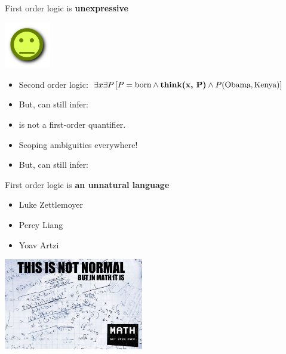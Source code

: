 \begin{frame}{First order logic is \textbf{unexpressive}}
\begin{center}
  \includegraphics[height=2cm]{../img/pokerface.png}
\end{center}

\begin{itemize}
\item Second order logic: 
      $\exists x \exists P \left[ P = \textrm{born} \land \textbf{\textrm{think}(x, P)} \land P(\textrm{Obama}, \textrm{Kenya}) \right]$
\pause
\item But, can still infer: 
\end{itemize}
\vspace{1ex}
\pause


\begin{itemize}
\item {} is not a first-order quantifier.
\item Scoping ambiguities everywhere!
\pause
\item But, can still infer: 
\end{itemize}

\end{frame}


\begin{frame}{First order logic is \textbf{an unnatural language}}

\begin{itemize}
\item[\checkmark] Luke Zettlemoyer
\item[\checkmark] Percy Liang
\item[\checkmark] Yoav Artzi
\end{itemize}
\vspace{1ex}
\pause

\begin{center}
  \includegraphics[height=4cm]{../img/math.jpg}
\end{center}
\end{frame}


